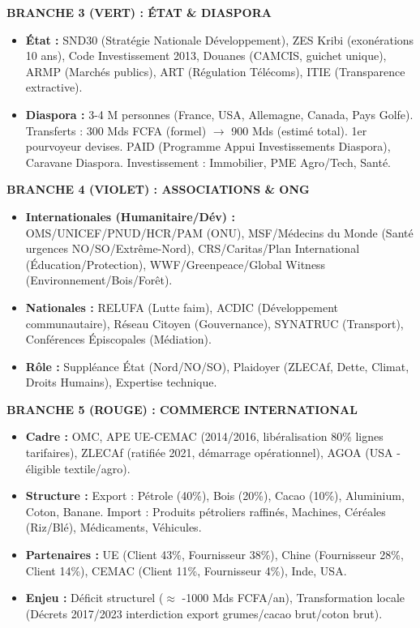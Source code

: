 \documentclass[11pt]{article}
\begin{document}
\begin{exoresolu}
\textbf{BRANCHE 3 (VERT) : ÉTAT \& DIASPORA}
\begin{itemize}
    \item \textbf{État :} SND30 (Stratégie Nationale Développement), ZES Kribi (exonérations 10 ans), Code Investissement 2013, Douanes (CAMCIS, guichet unique), ARMP (Marchés publics), ART (Régulation Télécoms), ITIE (Transparence extractive).
    \item \textbf{Diaspora :} 3-4 M personnes (France, USA, Allemagne, Canada, Pays Golfe). Transferts : 300 Mds FCFA (formel) $\rightarrow$ 900 Mds (estimé total). 1er pourvoyeur devises. PAID (Programme Appui Investissements Diaspora), Caravane Diaspora. Investissement : Immobilier, PME Agro/Tech, Santé.
\end{itemize}

\textbf{BRANCHE 4 (VIOLET) : ASSOCIATIONS \& ONG}
\begin{itemize}
    \item \textbf{Internationales (Humanitaire/Dév) :} OMS/UNICEF/PNUD/HCR/PAM (ONU), MSF/Médecins du Monde (Santé urgences NO/SO/Extrême-Nord), CRS/Caritas/Plan International (Éducation/Protection), WWF/Greenpeace/Global Witness (Environnement/Bois/Forêt).
    \item \textbf{Nationales :} RELUFA (Lutte faim), ACDIC (Développement communautaire), Réseau Citoyen (Gouvernance), SYNATRUC (Transport), Conférences Épiscopales (Médiation).
    \item \textbf{Rôle :} Suppléance État (Nord/NO/SO), Plaidoyer (ZLECAf, Dette, Climat, Droits Humains), Expertise technique.
\end{itemize}

\textbf{BRANCHE 5 (ROUGE) : COMMERCE INTERNATIONAL}
\begin{itemize}
    \item \textbf{Cadre :} OMC, APE UE-CEMAC (2014/2016, libéralisation 80\% lignes tarifaires), ZLECAf (ratifiée 2021, démarrage opérationnel), AGOA (USA - éligible textile/agro).
    \item \textbf{Structure :} Export : Pétrole (40\%), Bois (20\%), Cacao (10\%), Aluminium, Coton, Banane. Import : Produits pétroliers raffinés, Machines, Céréales (Riz/Blé), Médicaments, Véhicules.
    \item \textbf{Partenaires :} UE (Client 43\%, Fournisseur 38\%), Chine (Fournisseur 28\%, Client 14\%), CEMAC (Client 11\%, Fournisseur 4\%), Inde, USA.
    \item \textbf{Enjeu :} Déficit structurel ($\approx$ -1000 Mds FCFA/an), Transformation locale (Décrets 2017/2023 interdiction export grumes/cacao brut/coton brut).
\end{itemize}


\end{exoresolu}
\end{document}
